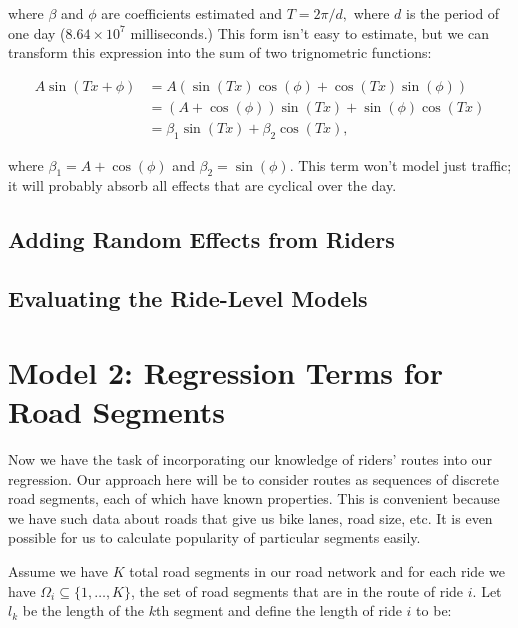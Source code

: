 \documentclass[12pt,twoside]{reedthesis}
\begin{document}
  where \(\beta\) and \(\phi\) are coefficients estimated and
  \(T = 2 \pi / d,\) where \(d\) is the period of one day
  (\(8.64 \times 10^7\) milliseconds.) This form isn't easy to estimate,
  but we can transform this expression into the sum of two trignometric
  functions:
  
  \begin{align*}
  A \sin (T x + \phi) &= 
  A \left( \sin (T x) \cos (\phi) + \cos (T x) \sin (\phi) \right)\\
  &= (A + \cos (\phi)) \sin (T x) + \sin (\phi) \cos (T x)\\
  &= \beta_1 \sin (T x) + \beta_2 \cos (T x),
  \end{align*}
  
  where \(\beta_1 = A + \cos (\phi)\) and \(\beta_2 = \sin (\phi).\) This
  term won't model just traffic; it will probably absorb all effects that
  are cyclical over the day.
  
  \section{Adding Random Effects from Riders}\label{add-riders}
  
  \section{Evaluating the Ride-Level
  Models}\label{evaluating-the-ride-level-models}
  
  \chapter{Model 2: Regression Terms for Road
  Segments}\label{model-2-regression-terms-for-road-segments}
  
  Now we have the task of incorporating our knowledge of riders' routes
  into our regression. Our approach here will be to consider routes as
  sequences of discrete road segments, each of which have known
  properties. This is convenient because we have such data about roads
  that give us bike lanes, road size, etc. It is even possible for us to
  calculate popularity of particular segments easily.
  
  Assume we have \(K\) total road segments in our road network and for
  each ride we have \(\Omega_i \subseteq \{1, \ldots, K\}\), the set of
  road segments that are in the route of ride \(i\). Let \(l_k\) be the
  length of the \(k\)th segment and define the length of ride \(i\) to be:
  
\end{document}
